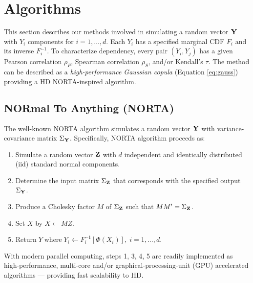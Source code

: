 \documentclass[
]{jss}
\providecommand{\tightlist}{%
  \setlength{\itemsep}{0pt}\setlength{\parskip}{0pt}}
\begin{document}
\clearpage

\hypertarget{algorithms}{%
\section{Algorithms}\label{algorithms}}

This section describes our methods involved in simulating a random vector \(\bf Y\) with \(Y_i\) components for \(i=1,\ldots,d\). Each \(Y_i\) has a specified marginal CDF \(F_i\) and its inverse \(F^{-1}_i\). To characterize dependency, every pair \((Y_i, Y_j)\) has a given Pearson correlation \(\rho_P\), Spearman correlation \(\rho_S\), and/or Kendall's \(\tau\). The method can be described as a \emph{high-performance Gaussian copula} (Equation \eqref{eq:gauss}) providing a HD NORTA-inspired algorithm.

\hypertarget{normal-to-anything-norta}{%
\subsection{NORmal To Anything (NORTA)}\label{normal-to-anything-norta}}

The well-known NORTA algorithm \citep{Cario1997} simulates a random vector \(\bf Y\) with variance-covariance matrix \(\Sigma_{\bf Y}\). Specifically, NORTA algorithm proceeds as:


\begin{enumerate}
\def\labelenumi{\arabic{enumi}.}
\tightlist
\item
  Simulate a random vector \(\bf Z\) with \(d\) independent and identically distributed (iid) standard normal components.
\item
  Determine the input matrix \(\Sigma_{\bf Z}\) that corresponds with the specified output \(\Sigma_{\bf Y}\).
\item
  Produce a Cholesky factor \(M\) of \(\Sigma_{\bf Z}\) such that \(M M^{\prime}=\Sigma_{\bf Z}\).
\item
  Set \(X\) by \(X \gets MZ\).
\item
  \(\text{Return} \; Y \; \text{where} \; Y_i \gets F_i^{-1}[\Phi(X_i)], \; i=1,...,d\).
\end{enumerate}


With modern parallel computing, steps 1, 3, 4, 5 are readily implemented as high-performance, multi-core and/or graphical-processing-unit (GPU) accelerated algorithms --- providing fast scalability to HD.
\end{document}
